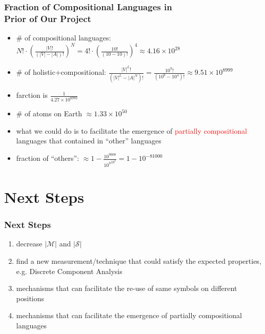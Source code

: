 \documentclass[compress,mathserif,xcolor=dvipsnames,svgnames,aspectratio=43]{beamer}
\begin{document}
\begin{frame}[c]
  \frametitle{Fraction of Compositional Languages in \\ Prior of Our Project}
  \begin{itemize}
    \item \# of compositional languages: \\ $N!\cdot \left(\frac{|V|!}{(|V|-|A|)!}\right)^N = 4!\cdot \left(\frac{10!}{(10-10)!}\right)^4 \approx 4.16\times 10^{28}$
    \pause
    \item \# of holistic+compositional: $\frac{|V|^L !}{(|V|^L - |A|^N)!} = \frac{10^9!}{(10^9-10^4)!} \approx 9.51\times 10^{8999}$
    \item farction is $\frac{1}{4.27\times 10^{8970}}$
    \pause
    \item \# of atoms on Earth $\approx 1.33\times 10^{50}$
    \item what we could do is to facilitate the emergence of \textcolor{red}{partially compositional} languages that contained in ``other'' languages
    \item fraction of ``others'': $\approx 1-\frac{10^9000}{{10^9}^{10^4}}=1- 10^{-81000}$
  \end{itemize}
\end{frame}


\section{Next Steps}

\begin{frame}[c]
  \frametitle{Next Steps}
  \begin{enumerate}
    \item decrease $|\mathcal{M}|$ and $|\mathcal{S}|$
    \item find a new measurement/technique that could satisfy the expected properties, e.g. Discrete Component Analysis
    \item mechanisms that can facilitate the re-use of same symbols on different positions
    \item mechanisms that can facilitate the emergence of partially compositional languages
  \end{enumerate}
  
\end{frame}


\appendix
{}
\setcounter{finalframe}{\value{framenumber}}
\end{document}
